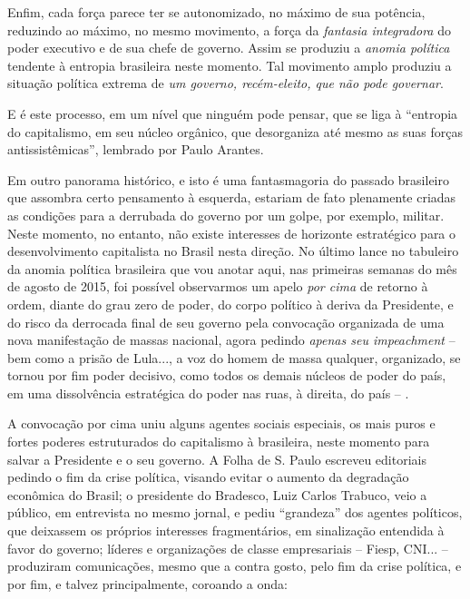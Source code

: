 Enfim, cada força parece ter se autonomizado, no máximo de sua potência,
reduzindo ao máximo, no mesmo movimento, a força da \emph{fantasia
integradora} do poder executivo e de sua chefe de governo. Assim se
produziu a \emph{anomia política} tendente à entropia brasileira neste
momento. Tal movimento amplo produziu a situação política extrema de
\emph{um governo, recém-eleito, que não pode governar}.

E é este processo, em um nível que ninguém pode pensar, que se liga à
``entropia do capitalismo, em seu núcleo orgânico, que desorganiza até
mesmo as suas forças antissistêmicas'', lembrado por Paulo Arantes.

Em outro panorama histórico, e isto é uma fantasmagoria do passado
brasileiro que assombra certo pensamento à esquerda, estariam de fato
plenamente criadas as condições para a derrubada do governo por um
golpe, por exemplo, militar. Neste momento, no entanto, não existe
interesses de horizonte estratégico para o desenvolvimento capitalista
no Brasil nesta direção. No último lance no tabuleiro da anomia política
brasileira que vou anotar aqui, nas primeiras semanas do mês de agosto
de 2015, foi possível observarmos um apelo \emph{por cima} de retorno à
ordem, diante do grau zero de poder, do corpo político à deriva da
Presidente, e do risco da derrocada final de seu governo pela convocação
organizada de uma nova manifestação de massas nacional, agora pedindo
\emph{apenas seu impeachment} -- bem como a prisão de Lula..., a voz do
homem de massa qualquer, organizado, se tornou por fim poder decisivo,
como todos os demais núcleos de poder do país, em uma dissolvência
estratégica do poder nas ruas, à direita, do país -- .

A convocação por cima uniu alguns agentes sociais especiais, os mais
puros e fortes poderes estruturados do capitalismo à brasileira, neste
momento para salvar a Presidente e o seu governo. A Folha de S. Paulo
escreveu editoriais pedindo o fim da crise política, visando evitar o
aumento da degradação econômica do Brasil; o presidente do Bradesco,
Luiz Carlos Trabuco, veio a público, em entrevista no mesmo jornal, e
pediu ``grandeza'' dos agentes políticos, que deixassem os próprios
interesses fragmentários, em sinalização entendida à favor do governo;
líderes e organizações de classe empresariais -- Fiesp, CNI... --
produziram comunicações, mesmo que a contra gosto, pelo fim da crise
política, e por fim, e talvez principalmente, coroando a onda:


